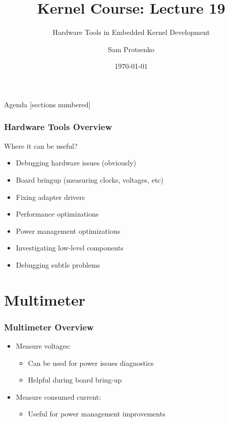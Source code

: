 \documentclass[aspectratio=169,usenames,dvipsnames]{beamer}
\title{Kernel Course: Lecture 19}
\subtitle{Hardware Tools in Embedded Kernel Development}
\date{\today}
\author{Sam Protsenko}
\institute{GlobalLogic}
\newcounter{cont}
\begin{document}

\maketitle

\begin{frame}{Agenda}
  [sections numbered]
  \tableofcontents[hideallsubsections]
\end{frame}


\begin{frame}
  \frametitle{Hardware Tools Overview}
  Where it can be useful?
  \begin{itemize}
    \item Debugging hardware issues (obviously)
    \item Board bringup (measuring clocks, voltages, etc)
    \item Fixing adapter drivers
    \item Performance optimizations
    \item Power management optimizations
    \item Investigating low-level components
    \item Debugging subtle problems
  \end{itemize}
\end{frame}

\section{Multimeter}

\begin{frame}
  \frametitle{Multimeter Overview}
  \begin{itemize}
    \item Measure voltages:
      \begin{itemize}
        \item Can be used for power issues diagnostics
        \item Helpful during board bring-up
      \end{itemize}
    \item Measure consumed current:
      \begin{itemize}
        \item Useful for power management improvements
      \end{itemize}
  \end{itemize}
\end{frame}
\end{document}
